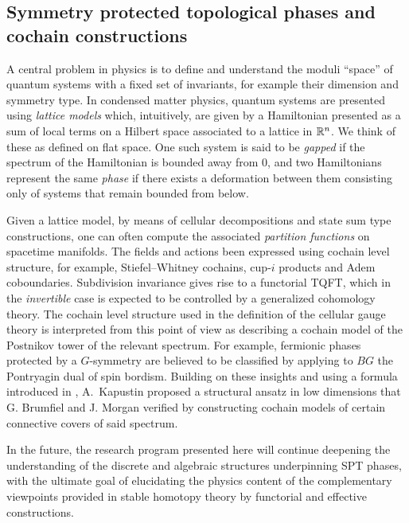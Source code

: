 \subsection{Symmetry protected topological phases and cochain constructions} \label{ss:spt phases}

A central problem in physics is to define and understand the moduli ``space'' of quantum systems with a fixed set of invariants, for example their dimension and symmetry type.
In condensed matter physics, quantum systems are presented using \textit{lattice models} which, intuitively, are given by a Hamiltonian presented as a sum of local terms on a Hilbert space associated to a lattice in $\mathbb{R}^n$.
We think of these as defined on flat space.
One such system is said to be \textit{gapped} if the spectrum of the Hamiltonian is bounded away from $0$, and two Hamiltonians represent the same \textit{phase} if there exists a deformation between them consisting only of systems that remain bounded from below.

Given a lattice model, by means of cellular decompositions and state sum type constructions, one can often compute the associated \textit{partition functions} on spacetime manifolds.
The fields and actions been expressed using cochain level structure, for example, Stiefel--Whitney cochains, cup-$i$ products and Adem coboundaries.
Subdivision invariance gives rise to a functorial TQFT, which in the \textit{invertible} case is expected to be controlled by a generalized cohomology theory.
The cochain level structure used in the definition of the cellular gauge theory is interpreted from this point of view as describing a cochain model of the Postnikov tower of the relevant spectrum.
For example, fermionic phases protected by a $G$-symmetry are believed to be classified by applying to $BG$ the Pontryagin dual of spin bordism.
Building on these insights and using a formula introduced in \cite{medina2020cartan}, A.~Kapustin proposed a structural ansatz in low dimensions that G. Brumfiel and J. Morgan verified by constructing cochain models of certain connective covers of said spectrum.

In the future, the research program presented here will continue deepening the understanding of the discrete and algebraic structures underpinning SPT phases, with the ultimate goal of elucidating the physics content of the complementary viewpoints provided in stable homotopy theory by functorial and effective constructions.


